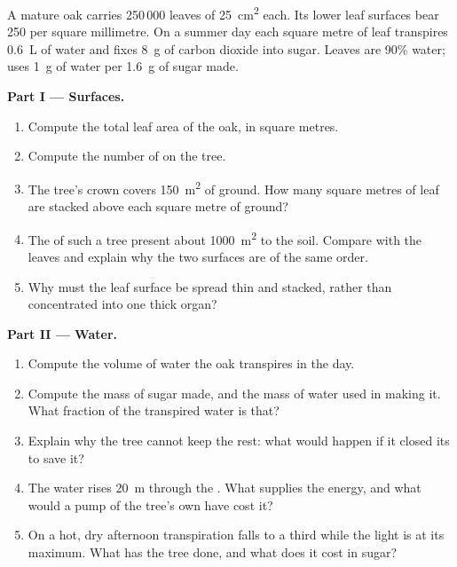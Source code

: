 \begin{problem}
\label{pb:g12:plant-rooted-life:1}
A mature oak carries 250\,000 leaves of \qty{25}{cm^2} each. Its lower
leaf surfaces bear 250  per square millimetre. On a summer day
each square metre of leaf transpires \qty{0.6}{L} of water and fixes
\qty{8}{g} of carbon dioxide into sugar. Leaves are 90\% water;
 uses \qty{1}{g} of water per \qty{1.6}{g} of sugar
made.

\medskip
\noindent\textbf{Part I --- Surfaces.}
\begin{enumerate}
  \item Compute the total leaf area of the oak, in square metres.
  \item Compute the number of  on the tree.
  \item The tree's crown covers \qty{150}{m^2} of ground. How many
        square metres of leaf are stacked above each square metre of
        ground?
  \item The  of such a tree present about \qty{1000}{m^2} to
        the soil. Compare with the leaves and explain why the two
        surfaces are of the same order.
  \item Why must the leaf surface be spread thin and stacked, rather
        than concentrated into one thick organ?
\end{enumerate}

\medskip
\noindent\textbf{Part II --- Water.}
\begin{enumerate}[resume]
  \item Compute the volume of water the oak transpires in the day.
  \item Compute the mass of sugar made, and the mass of water used in
        making it. What fraction of the transpired water is that?
  \item Explain why the tree cannot keep the rest: what would happen if
        it closed its  to save it?
  \item The water rises \qty{20}{m} through the . What supplies
        the energy, and what would a pump of the tree's own have cost
        it?
  \item On a hot, dry afternoon transpiration falls to a third while
        the light is at its maximum. What has the tree done, and what
        does it cost in sugar?
\end{enumerate}


\end{problem}
